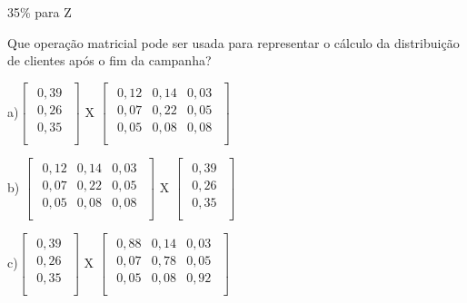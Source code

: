 \documentclass{article}
\begin{document}
\begin{enumerate}
35\% para Z \newline


Que operação matricial pode ser usada para representar o cálculo da distribuição de
clientes após o fim da campanha?\newline


a)$
 \left [ \begin{matrix} 
    \begin{array}{c}
    0,39 \\
    0,26  \\
    0,35  \\
\end{array}
\end{matrix} \right ]$ X
$
 \left [ \begin{matrix} 
    \begin{array}{ccc}
    0,12 & 0,14 & 0,03  \\
    0,07 & 0,22 & 0,05  \\
    0,05 & 0,08 & 0,08  \\
\end{array}
\end{matrix} \right ]$ \newline


b) $
 \left [ \begin{matrix} 
    \begin{array}{ccc}
    0,12 & 0,14 & 0,03  \\
    0,07 & 0,22 & 0,05  \\
    0,05 & 0,08 & 0,08  \\
\end{array}
\end{matrix} \right ]$ X
$
 \left [ \begin{matrix} 
    \begin{array}{c}
    0,39 \\
    0,26  \\
    0,35  \\
\end{array}
\end{matrix} \right ]$


c)$
 \left [ \begin{matrix} 
    \begin{array}{c}
    0,39 \\
    0,26  \\
    0,35  \\
\end{array}
\end{matrix} \right ]$ X
$
 \left [ \begin{matrix} 
    \begin{array}{ccc}
    0,88 & 0,14 & 0,03  \\
    0,07 & 0,78 & 0,05  \\
    0,05 & 0,08 & 0,92  \\
\end{array}
\end{matrix} \right ]$ \newline



\end{enumerate}
\end{document}
